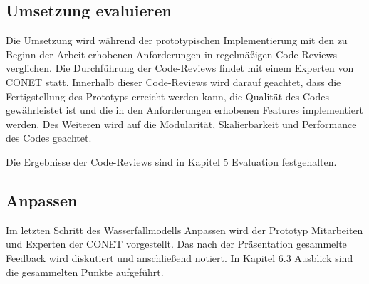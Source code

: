 \subsection{Umsetzung evaluieren}
Die Umsetzung wird während der prototypischen Implementierung mit den zu Beginn der Arbeit erhobenen Anforderungen in regelmäßigen Code-Reviews verglichen. Die Durchführung der Code-Reviews findet mit einem Experten von CONET statt. Innerhalb dieser Code-Reviews wird darauf geachtet, dass die Fertigstellung des Prototyps erreicht werden kann, die Qualität des Codes gewährleistet ist und die in den Anforderungen erhobenen Features implementiert werden. Des Weiteren wird auf die Modularität, Skalierbarkeit und Performance des Codes geachtet.

Die Ergebnisse der Code-Reviews sind in Kapitel 5 \glqq Evaluation\grqq{} festgehalten. 

\subsection{Anpassen}
Im letzten Schritt des Wasserfallmodells \glqq Anpassen\grqq{} wird der Prototyp Mitarbeiten und Experten der CONET vorgestellt. Das nach der Präsentation gesammelte Feedback wird diskutiert und anschließend notiert. In Kapitel 6.3 \glqq Ausblick\grqq{} sind die gesammelten Punkte aufgeführt. 